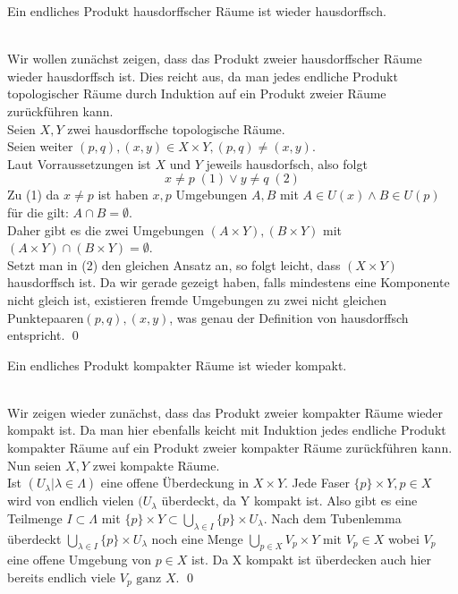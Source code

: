 	\begin{Satz}
		Ein endliches Produkt hausdorffscher Räume ist wieder hausdorffsch.
		
	\end{Satz}
		\\
		Wir wollen zunächst zeigen, dass das Produkt zweier hausdorffscher Räume wieder hausdorffsch ist. Dies reicht aus, da man jedes endliche Produkt topologischer Räume
		durch Induktion auf ein Produkt zweier Räume zurückführen kann. \\
		Seien \(X, Y\) zwei hausdorffsche topologische Räume.\\
		Seien weiter \( (p,q), (x,y) \in X \times Y, (p,q) \ne (x,y) \). \\
		Laut Vorraussetzungen ist \(X\) und \(Y\) jeweils hausdorfsch, also folgt 
		\[x \ne p \; (1) \lor y \ne q \; (2) \]
		Zu (1) da \(x \ne p \) ist haben \(x, p \) Umgebungen \(A, B \) mit \( A \in U(x)  \land B \in U(p) \) für die gilt: \(A \cap B = \emptyset \).\\ Daher gibt es die
		zwei Umgebungen \( (A \times Y), (B \times Y) \) mit \( (A \times Y) \cap (B \times Y) = \emptyset \). \\
		Setzt man in (2) den gleichen Ansatz an, so folgt leicht, dass \( (X \times Y) \) hausdorffsch ist. Da wir gerade gezeigt haben, falls mindestens eine Komponente
		nicht gleich ist,	existieren fremde Umgebungen zu zwei nicht gleichen Punktepaaren\( (p,q), (x,y) \), was genau der Definition von hausdorffsch entspricht.
	\qed
	\\
	\begin{Satz}
		Ein endliches Produkt kompakter Räume ist wieder kompakt.
		
	\end{Satz}
	\\
	Wir zeigen wieder zunächst, dass das Produkt zweier kompakter Räume wieder kompakt ist. Da man hier ebenfalls keicht mit Induktion jedes endliche Produkt kompakter Räume 
	auf ein Produkt zweier kompakter Räume zurückführen kann. \\
	Nun seien \(X, Y\) zwei kompakte Räume.\\
	Ist \((U_{\lambda} | \lambda \in \Lambda) \) eine offene Überdeckung in \(X \times Y \). Jede Faser \( \{p\} \times Y, p \in X \) wird von endlich vielen \((U_{\lambda} \) überdeckt,
	da Y kompakt ist. Also gibt es eine Teilmenge \( I \subset \Lambda \) mit \( \{p\} \times Y \subset \bigcup_{ \lambda \in I } \{p\} \times U_{\lambda} \). 
	Nach dem Tubenlemma überdeckt \( \bigcup_{ \lambda \in I } \{p\} \times U_{\lambda} \) noch eine Menge \(\bigcup_{ p \in X } V_{p} \times Y \mbox{ mit } V_{p} \in X \) 
	wobei \( V_{p} \) eine offene Umgebung von \( p \in X \) ist. Da X kompakt ist überdecken auch hier bereits endlich viele \(V_{p} \mbox{ ganz } X \). 
	\qed
	
